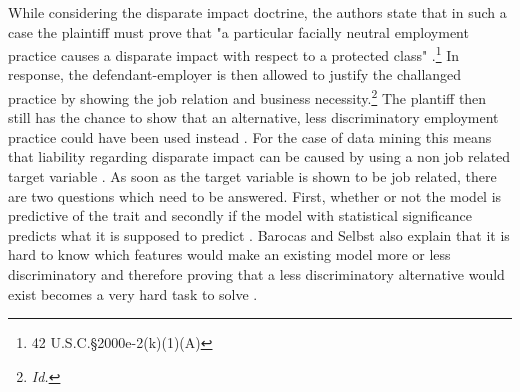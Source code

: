 While considering the disparate impact doctrine, the authors state that in such a case 
the plaintiff must prove that "a particular facially neutral employment practice causes 
a disparate impact with respect to a protected class" \cite{Barocas.2016} 
\cite{titleVII}.\footnote{ 42 U.S.C.§2000e-2(k)(1)(A) } In response, the defendant-employer 
is then allowed to justify the challanged practice by showing the job relation and 
business necessity.\footnote{ \textit{Id.} } The plantiff then still has the chance 
to show that an alternative, less discriminatory employment practice could have been 
used instead \cite{Barocas.2016}. For the case of data mining this means that liability 
regarding disparate impact can be caused by using a non job related target variable 
\cite{Barocas.2016}. As soon as the target variable is shown to be job related, there 
are two questions which need to be answered. First, whether or not the model is 
predictive of the trait and secondly if the model with statistical significance 
predicts what it is supposed to predict \cite{Barocas.2016}. Barocas and Selbst 
also explain that it is hard to know which features would make an existing model more
or less discriminatory and therefore proving that a less discriminatory alternative 
would exist becomes a very hard task to solve \cite{Barocas.2016}.



